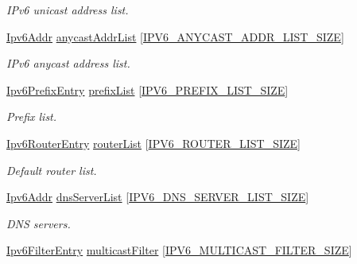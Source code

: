 \begin{DoxyCompactItemize}
\begin{DoxyCompactList}\small\item\em I\+Pv6 unicast address list. \end{DoxyCompactList}\item 
\hyperlink{ipv6_8h_aed0cbc40c61ed5b4fb681ebc55237e89}{Ipv6\+Addr} \hyperlink{structIpv6Context_a1ff294cc4f4dc7678e37f5ba6b557440}{anycast\+Addr\+List} \mbox{[}\hyperlink{ipv6_8h_ab01594dcab02d6075c20e22954c2d872}{I\+P\+V6\+\_\+\+A\+N\+Y\+C\+A\+S\+T\+\_\+\+A\+D\+D\+R\+\_\+\+L\+I\+S\+T\+\_\+\+S\+I\+ZE}\mbox{]}
\begin{DoxyCompactList}\small\item\em I\+Pv6 anycast address list. \end{DoxyCompactList}\item 
\hyperlink{structIpv6PrefixEntry}{Ipv6\+Prefix\+Entry} \hyperlink{structIpv6Context_aa70737b1f0de61b8ebd4c4a13889ae64}{prefix\+List} \mbox{[}\hyperlink{ipv6_8h_a928a90013c8822cded35706806f00171}{I\+P\+V6\+\_\+\+P\+R\+E\+F\+I\+X\+\_\+\+L\+I\+S\+T\+\_\+\+S\+I\+ZE}\mbox{]}
\begin{DoxyCompactList}\small\item\em Prefix list. \end{DoxyCompactList}\item 
\hyperlink{structIpv6RouterEntry}{Ipv6\+Router\+Entry} \hyperlink{structIpv6Context_a4c25546c426cb05cd5cfba93b06de694}{router\+List} \mbox{[}\hyperlink{ipv6_8h_af61cd2a89ea067f9ecd5a7f7d9649bba}{I\+P\+V6\+\_\+\+R\+O\+U\+T\+E\+R\+\_\+\+L\+I\+S\+T\+\_\+\+S\+I\+ZE}\mbox{]}
\begin{DoxyCompactList}\small\item\em Default router list. \end{DoxyCompactList}\item 
\hyperlink{ipv6_8h_aed0cbc40c61ed5b4fb681ebc55237e89}{Ipv6\+Addr} \hyperlink{structIpv6Context_a62347c5c24f0c65b5055395f08612ae3}{dns\+Server\+List} \mbox{[}\hyperlink{ipv6_8h_a7ef30c7f719916efa14b509b7ef707a1}{I\+P\+V6\+\_\+\+D\+N\+S\+\_\+\+S\+E\+R\+V\+E\+R\+\_\+\+L\+I\+S\+T\+\_\+\+S\+I\+ZE}\mbox{]}
\begin{DoxyCompactList}\small\item\em D\+NS servers. \end{DoxyCompactList}\item 
\hyperlink{structIpv6FilterEntry}{Ipv6\+Filter\+Entry} \hyperlink{structIpv6Context_af8b9f2c394c52382d24f651df2329fbe}{multicast\+Filter} \mbox{[}\hyperlink{net__config_8h_a76328e1ef9ee7a408d4fb6bcfa62b910}{I\+P\+V6\+\_\+\+M\+U\+L\+T\+I\+C\+A\+S\+T\+\_\+\+F\+I\+L\+T\+E\+R\+\_\+\+S\+I\+ZE}\mbox{]}

\end{DoxyCompactItemize}
